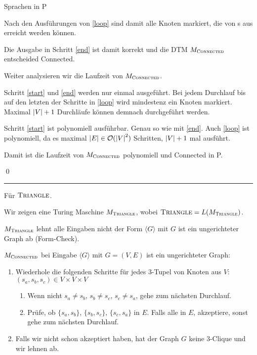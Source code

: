 \documentclass[answers]{submit}
\begin{document}
\begin{exercise}[6]{Sprachen in P}
{    Nach den Ausführungen von \ref{loop} sind damit alle Knoten markiert, die von s aus erreicht
    werden können.

    Die Ausgabe in Schritt \ref{end} ist damit korrekt und die DTM $M_{\textsc{Connected}}$ entscheided
    Connected.

    \vspace{0.2cm}

    Weiter analysieren wir die Laufzeit von $M_{\textsc{Connected}}$.

    Schritt \ref{start} und \ref{end} werden nur einmal ausgeführt. Bei jedem Durchlauf bis auf den letzten
    der Schritte in \ref{loop} wird mindestenz ein Knoten markiert. Maximal $\left\vert V \right\vert + 1$ Durchläufe
    können demnach durchgeführt werden.

    Schritt \ref{start} ist polynomiell ausführbar. Genau so wie mit \ref{end}. Auch \ref{loop} ist polynomiell, da
    es maximal $\left\vert E \right\vert\in\mathcal{O}(\left\vert V \right\vert^2)$ Schritten, $\left\vert V \right\vert + 1$ mal ausführt.

    Damit ist die Laufzeit von $M_{\textsc{Connected}}$ polynomiell und Connected in P.

    \qed

    \rule{\textwidth}{0.4pt}

    Für $\textsc{Triangle}$.

    Wir zeigen eine Turing Maschine $M_{\textsc{Triangle}}$, wobei $\textsc{Triangle} = L(M_{\textsc{Triangle}})$.

    $M_{\textsc{Triangle}}$ lehnt alle Eingaben nicht der Form $\langle G\rangle$ mit $G$ ist ein ungerichteter Graph ab (Form-Check).

    $M_{\textsc{Connected}}$ bei Eingabe $\langle G\rangle$ mit $G = (V, E)$ ist ein ungerichteter Graph:

    \begin{enumerate}[itemsep=0em]
      \item Wiederhole die folgenden Schritte für jedes $3$-Tupel von Knoten aus $V$: $(s_a,s_b,s_c)\in V\times V\times V$ \label{tri:loop}
            \begin{enumerate}[itemsep=0em]
              \item Wenn nicht $s_a\neq s_b$, $s_b\neq s_c$, $s_c\neq s_a$, gehe zum nächsten Durchlauf. \label{tri:check}
              \item Prüfe, ob $\{s_a, s_b\}$, $\{s_b, s_c\}$, $\{s_c, s_a\}$ in $E$. Falls alle in $E$, akzeptiere, sonst gehe zum nächsten Durchlauf. \label{tri:search}
            \end{enumerate}
      \item Falls wir nicht schon akzeptiert haben, hat der Graph $G$ keine $3$-Clique und wir lehnen ab. \label{tri:reject}
    \end{enumerate}

}
\end{exercise}
\end{document}
